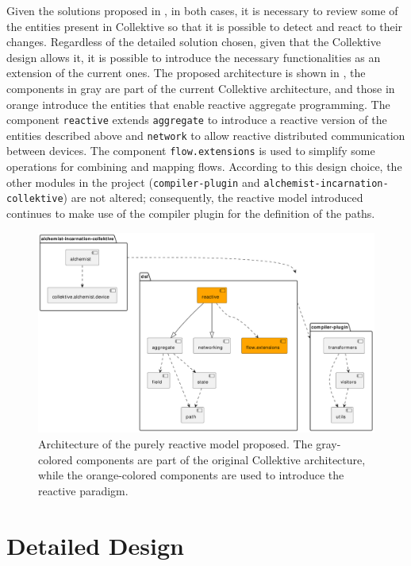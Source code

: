 Given the solutions proposed in , in both cases, it is necessary to review some of the entities present in Collektive so that it is possible to detect and react to their changes. Regardless of the detailed solution chosen, given that the Collektive design allows it, it is possible to introduce the necessary functionalities as an extension of the current ones. The proposed architecture is shown in , the components in gray are part of the current Collektive architecture, and those in orange introduce the entities that enable reactive aggregate programming. The component \texttt{reactive} extends \texttt{aggregate} to introduce a reactive version of the entities described above and \texttt{network} to allow reactive distributed communication between devices. The component \texttt{flow.extensions} is used to simplify some operations for combining and mapping flows. According to this design choice, the other modules in the project (\texttt{compiler-plugin} and \texttt{alchemist-incarnation-collektive}) are not altered; consequently, the reactive model introduced continues to make use of the compiler plugin for the definition of the paths.

\begin{figure}
    \centering
    \includegraphics[width=\linewidth]{figures/collektive-prm-architecture.pdf}
    \caption{Architecture of the purely reactive model proposed. The gray-colored components are part of the original Collektive architecture, while the orange-colored components are used to introduce the reactive paradigm.}
    \label{fig:collektive-prm-architecture}
\end{figure}

\section{Detailed Design}


